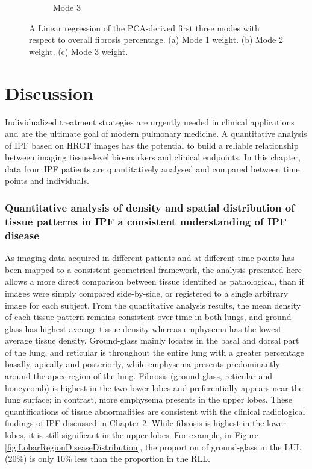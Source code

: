 \begin{figure}[H]
\begin{subfigure}{.72\linewidth}
  \caption{Mode 3}
  \label{fig:ShapeVSFibrosis-c}
\end{subfigure}
\caption{ A Linear regression of the PCA-derived first three modes with respect to overall fibrosis percentage. (a) Mode 1 weight. (b) Mode 2 weight. (c) Mode 3  weight.}
\label{fig:ShapeVSFibrosis}
\end{figure}

\section{Discussion} \label{QuantitativeDiscussion}
Individualized treatment strategies are urgently needed in clinical applications and are the ultimate goal of modern pulmonary medicine. A quantitative analysis of IPF based on HRCT images has the potential to build a reliable relationship between imaging tissue-level bio-markers and clinical endpoints. In this chapter, data from IPF patients are quantitatively analysed and compared between time points and individuals.

\subsubsection{Quantitative analysis of density and spatial distribution of tissue patterns in IPF a consistent understanding of IPF disease}
As imaging data acquired in different patients and at different time points has been mapped to a consistent geometrical framework, the analysis presented here allows a more direct comparison between tissue identified as pathological, than if images were simply compared side-by-side, or registered to a single arbitrary image for each subject. From the quantitative analysis results, the mean density of each tissue pattern remains consistent over time in both lungs, and ground-glass has highest average tissue density whereas emphysema has the lowest average tissue density. Ground-glass mainly locates in the basal and dorsal part of the lung, and reticular is throughout the entire lung with a greater percentage basally, apically and posteriorly, while emphysema presents predominantly around the apex region of the lung. Fibrosis (ground-glass, reticular and honeycomb) is highest in the two lower lobes and preferentially appears near the lung surface; in contrast, more emphysema presents in the upper lobes. These quantifications of tissue abnormalities are consistent with the clinical radiological findings of IPF discussed in Chapter 2. While fibrosis is highest in the lower lobes, it is still significant in the upper lobes. For example, in Figure \ref{fig:LobarRegionDiseaseDistribution}, the proportion of ground-glass in the LUL (20\%) is only 10\% less than the proportion in the RLL. 

